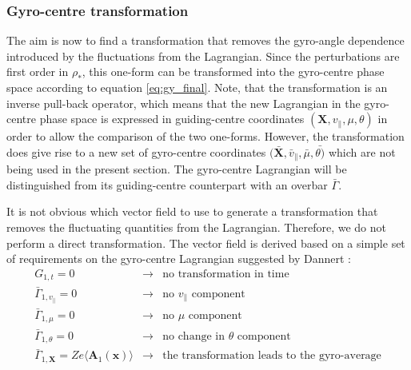 \documentclass[a4paper,10pt]{article}
\renewcommand{\vec}[1]{\mathbf{#1}}
\begin{document}
\subsubsection{Gyro-centre transformation} \label{sec:gyro_derive}
The aim is now to find a transformation that removes the gyro-angle dependence introduced by the fluctuations from the Lagrangian. Since the perturbations are first order in $\rho_*$, this one-form can be transformed into the gyro-centre phase space according to equation \ref{eq:gy_final}. Note, that the transformation is an inverse pull-back operator, which means that the new Lagrangian in the gyro-centre phase space is expressed in guiding-centre coordinates $(\vec{X},v_{\parallel},\mu,\theta)$ in order to allow the comparison of the two one-forms. However, the transformation does give rise to a new set of gyro-centre coordinates $(\bar{\vec{X}},\bar{v}_{\parallel},\bar{\mu},\bar{\theta)}$ which are not being used in the present section. The gyro-centre Lagrangian will be distinguished from its guiding-centre counterpart with an overbar $\bar{\Gamma}$. 

It is not obvious which vector field to use to generate a transformation that removes the fluctuating quantities from the Lagrangian. Therefore, we do not perform a direct transformation. The vector field is derived based on a simple set of requirements on the gyro-centre Lagrangian suggested by Dannert \cite{dannert}:
\begin{eqnarray*}
	G_{1,t} = 0 &\to& \textrm{no transformation in time} \\
	\bar{\Gamma}_{1,v_{\parallel}} = 0 &\to& \textrm{no $v_{\parallel}$ component} \\
	\bar{\Gamma}_{1,\mu} = 0 &\to& \textrm{no $\mu$ component} \\
	\bar{\Gamma}_{1,\theta} = 0 &\to& \textrm{no change in $\theta$ component} \\
	\bar{\Gamma}_{1,\mathbf{X}} = Z e \langle \mathbf{A}_1(\vec{x}) \rangle &\to& \textrm{the transformation leads to the gyro-average}
\end{eqnarray*}
\end{document}
